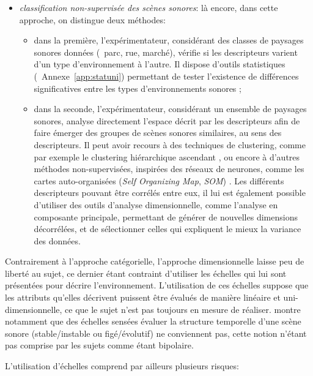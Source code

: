 \begin{itemize}
\item \emph{classification non-supervisée des scènes sonores}: là encore, dans cette approche, on distingue deux méthodes:

\begin{itemize}
\item dans la première, l'expérimentateur, considérant des classes de paysages sonores données (\eg~parc, rue, marché), vérifie si les descripteurs varient d'un type d'environnement à l'autre. Il dispose d'outils statistiques (\cf~Annexe~\ref{app:statuni}) permettant de tester l'existence de différences significatives entre les types d'environnements sonores \citep{hong2013designing};
\item dans la seconde, l'expérimentateur, considérant un ensemble de paysages sonores, analyse directement l'espace décrit par les descripteurs afin de faire émerger des groupes de scènes sonores similaires, au sens des descripteurs. Il peut avoir recours à des techniques de clustering, comme par exemple le clustering hiérarchique ascendant \citep{torija2013application}, ou encore à d'autres méthodes non-supervisées, inspirées des réseaux de neurones, comme les cartes auto-organisées (\emph{Self Organizing Map}, \emph{SOM}) \citep{ricciardi2015sound}. Les différents descripteurs pouvant être corrélés entre eux, il lui est également possible d'utiliser des outils d'analyse dimensionnelle, comme l'analyse en composante principale, permettant de générer de nouvelles dimensions décorrélées, et de sélectionner celles qui expliquent le mieux la variance des données.
\end{itemize}

\end{itemize}

Contrairement à l'approche catégorielle, l'approche dimensionnelle laisse peu de liberté au sujet, ce dernier étant contraint d'utiliser les échelles qui lui sont présentées pour décrire l'environnement. L'utilisation de ces échelles suppose que les attributs qu'elles décrivent puissent être évalués de manière linéaire et uni-dimensionnelle, ce que le sujet n'est pas toujours en mesure de réaliser. \citep{raimbault2006qualitative} montre notamment que des échelles sensées évaluer la structure temporelle d'une scène sonore (stable/instable ou figé/évolutif) ne conviennent pas, cette notion n'étant pas comprise par les sujets comme étant bipolaire.

L'utilisation d'échelles comprend par ailleurs plusieurs risques:

